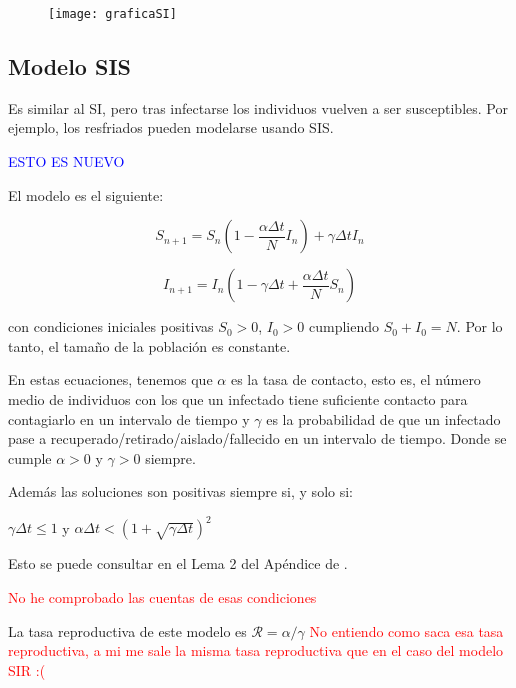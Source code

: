 \begin{figure}[H]
\begin{center}
\texttt{[image: graficaSI]}
\end{center}
\end{figure}


\subsection{Modelo SIS}
Es similar al SI, pero tras infectarse los individuos vuelven a ser susceptibles.
Por ejemplo, los resfriados pueden modelarse usando SIS.

\textcolor{blue}{ESTO ES NUEVO}

El modelo es el siguiente:

\begin{equation}
\label{eqn: modelo_SIS_S}
S_{n+1} = S_n \left(1-\frac{\alpha\Delta t}{N} I_n \right) + \gamma \Delta t I_n
\end{equation}

\begin{equation}
\label{eqn: modelo_SIS_I}
I_{n+1} = I_n \left( 1-\gamma \Delta t + \frac{\alpha\Delta t}{N} S_n \right)
\end{equation}

con condiciones iniciales positivas $S_0>0$, $I_0>0$ cumpliendo $S_0+I_0=N$. Por lo tanto, el tamaño de la población es constante.

En estas ecuaciones, tenemos que $\alpha$ es la tasa de contacto, esto es, el número medio de individuos con los que un infectado tiene suficiente contacto para contagiarlo en un intervalo de tiempo y $\gamma$ es la probabilidad de que un infectado pase a recuperado/retirado/aislado/fallecido en un intervalo de tiempo. Donde se cumple $\alpha >0$ y $\gamma >0$ siempre.

Además las soluciones son positivas siempre si, y solo si:

$\gamma \Delta t \leq 1$ y $\alpha\Delta t< \left( 1+\sqrt{\gamma \Delta t} \right)^2$

Esto se puede consultar en el Lema 2 del Apéndice de \cite{allenDiscretetimeSISIR1994}.

\textcolor{red}{No he comprobado las cuentas de esas condiciones}

La tasa reproductiva de este modelo es $\mathcal{R}=\alpha /\gamma$ \textcolor{red}{No entiendo como saca esa tasa reproductiva, a mi me sale la misma tasa reproductiva que en el caso del modelo SIR :(}

